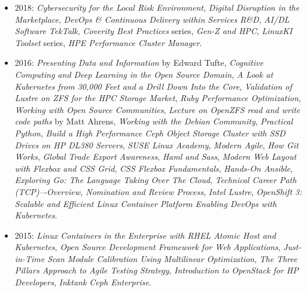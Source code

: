 \documentclass[10pt,letterpaper,oneside]{report}
\begin{document}
\begin{itemize}
  \item 2018: \textit{Cybersecurity for the Local Risk Environment},
    \textit{Digital Disruption in the Marketplace},
    \textit{DevOps \& Continuous Delivery within Services R\&D},
    \textit{AI/DL Software TekTalk},
    \textit{Coverity Best Practices} series,
    \textit{Gen-Z and HPC},
    \textit{LinuxKI Toolset} series,
    \textit{HPE Performance Cluster Manager}.

  \item 2016: \textit{Presenting Data and Information} by Edward Tufte,
    \textit{Cognitive Computing and Deep Learning in the Open Source Domain},
    \textit{A Look at Kubernetes from 30,000 Feet and a Drill Down Into the Core},
    \textit{Validation of Lustre on ZFS for the HPC Storage Market},
    \textit{Ruby Performance Optimization},
    \textit{Working with Open Source Communities},
    \textit{Lecture on OpenZFS read and write code paths} by Matt Ahrens,
    \textit{Working with the Debian Community},
    \textit{Practical Python},
    \textit{Build a High Performance Ceph Object Storage Cluster with SSD Drives on HP DL380 Servers},
    \textit{SUSE Linux Academy},
    \textit{Modern Agile},
    \textit{How Git Works},
    \textit{Global Trade Export Awareness},
    \textit{Haml and Sass},
    \textit{Modern Web Layout with Flexbox and CSS Grid},
    \textit{CSS Flexbox Fundamentals},
    \textit{Hands-On Ansible},
    \textit{Exploring Go: The Language Taking Over The Cloud},
    \textit{Technical Career Path (TCP)–-Overview, Nomination and Review Process},
    \textit{Intel Lustre},
    \textit{OpenShift 3: Scalable and Efficient Linux Container Platform Enabling DevOps with Kubernetes}.

  \item 2015: \textit{Linux Containers in the Enterprise with RHEL Atomic Host and Kubernetes},
    \textit{Open Source Development Framework for Web Applications},
    \textit{Just-in-Time Scan Module Calibration Using Multilinear Optimization},
    \textit{The Three Pillars Approach to Agile Testing Strategy},
    \textit{Introduction to OpenStack for HP Developers},
    \textit{Inktank Ceph Enterprise}.


\end{itemize}
\end{document}
